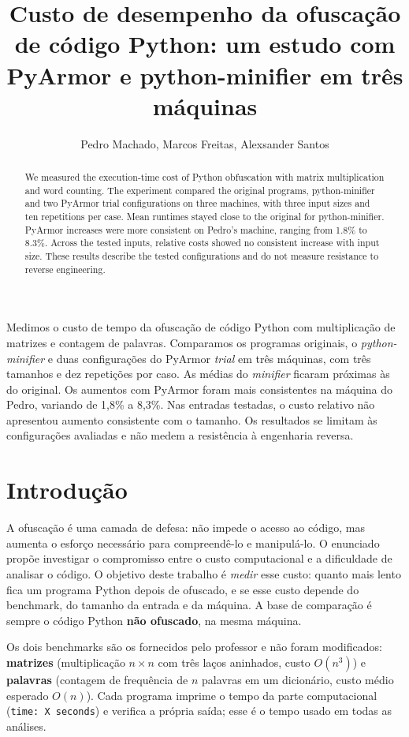 \documentclass[12pt]{article}
\title{Custo de desempenho da ofuscação de código Python: um estudo com PyArmor e python-minifier em três máquinas}
\author{Pedro Machado\inst{1}, Marcos Freitas\inst{1},
  Alexsander Santos\inst{1}}
\begin{document}
\maketitle

\begin{abstract}
We measured the execution-time cost of Python obfuscation with matrix multiplication and word counting.
The experiment compared the original programs, python-minifier and two PyArmor trial configurations on
three machines, with three input sizes and ten repetitions per case. Mean runtimes stayed close to the
original for python-minifier. PyArmor increases were more consistent on Pedro's machine, ranging from
1.8\% to 8.3\%. Across the tested inputs, relative costs showed no consistent increase with input size.
These results describe the tested configurations and do not measure resistance to reverse engineering.
\end{abstract}

\begin{resumo}
Medimos o custo de tempo da ofuscação de código Python com multiplicação de matrizes e contagem de palavras.
Comparamos os programas originais, o \emph{python-minifier} e duas configurações do PyArmor \emph{trial} em três
máquinas, com três tamanhos e dez repetições por caso. As médias do \emph{minifier} ficaram próximas às do
original. Os aumentos com PyArmor foram mais consistentes na máquina do Pedro, variando de 1,8\% a 8,3\%.
Nas entradas testadas, o custo relativo não apresentou aumento consistente com o tamanho. Os resultados
se limitam às configurações avaliadas e não medem a resistência à engenharia reversa.
\end{resumo}


\section{Introdução}
A ofuscação é uma camada de defesa: não impede o acesso ao código, mas aumenta o esforço necessário para
compreendê-lo e manipulá-lo. O enunciado propõe investigar o compromisso entre o custo computacional e a dificuldade de analisar o código. O objetivo deste trabalho é \emph{medir} esse custo: quanto
mais lento fica um programa Python depois de ofuscado, e se esse custo depende do benchmark, do tamanho da
entrada e da máquina. A base de comparação é sempre o código Python \textbf{não ofuscado}, na mesma máquina.

Os dois benchmarks são os fornecidos pelo professor e não foram modificados: \textbf{matrizes} (multiplicação
$n\times n$ com três laços aninhados, custo $O(n^3)$) e \textbf{palavras} (contagem de frequência de $n$ palavras
em um dicionário, custo médio esperado $O(n)$). Cada programa imprime o tempo da parte computacional (\texttt{time: X seconds}) e
verifica a própria saída; esse é o tempo usado em todas as análises.
\end{document}
